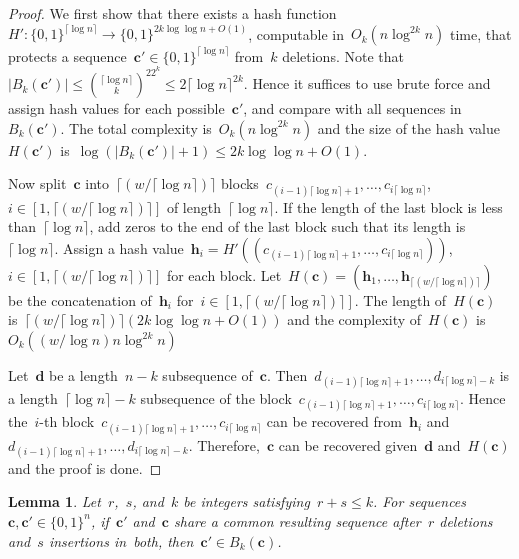 \documentclass[10pt,a4paper,onecolumn]{IEEEtran}
\newtheorem{lemma}{Lemma}
\newcommand{\1}{\mathbbold{1}}
\newcommand{\boldc}{\mathbf{c}}
\newcommand{\boldd}{\mathbf{d}}
\newcommand{\boldh}{\mathbf{h}}
\begin{document}
\begin{proof}
We first show that there exists a hash function~$H': \{0,1\}^{\lceil \log n \rceil}\rightarrow\{0,1\}^{2k\log\log n +O(1)}$, computable in~$O_k(n \log^{2k}n)$ time, that protects a sequence~$\boldc'\in \{0,1\}^{\lceil \log n\rceil}$ from~$k$ deletions. Note that~$|B_k(\boldc')|\le \binom{\lceil \log n\rceil}{k}^22^k\le 2\lceil\log n\rceil^{2k}$. Hence it suffices to use brute force and assign hash values for each possible~$\boldc'$, and compare with all sequences in~$B_k(\boldc')$. The total complexity is~$O_k(n\log^{2k}n)$ and the size of the hash value~$H(\boldc')$ is~$\log (|B_k(\boldc')|+1)\le 2k\log\log n+O(1)$. 

Now split~$\boldc$ into~$\lceil(w/\lceil \log n\rceil)\rceil$ blocks~$c_{(i-1)\lceil \log n \rceil+1},\ldots,c_{i\lceil \log n \rceil}$,~$i\in [1,\lceil(w/\lceil \log n\rceil)\rceil]$ of length~$\lceil \log n \rceil$. If the length of the last block is less than~$\lceil \log n \rceil$, add zeros to the end of the last block such that its length is~$\lceil \log n \rceil$.
Assign a hash value~$\boldh_i=H'((c_{(i-1)\lceil \log n \rceil+1},\ldots,c_{i\lceil \log n \rceil}))$,~$i\in [1,\lceil(w/\lceil \log n\rceil)\rceil]$ for each block. Let~$H(\boldc)=(\boldh_1,\ldots,\boldh_{\lceil(w/\lceil \log n\rceil)\rceil})$ be the concatenation of~$\boldh_i$ for~$i\in [1,\lceil(w/\lceil \log n\rceil)\rceil]$. The length of~$H(\boldc)$ is~$\lceil (w/\lceil \log n \rceil) \rceil (2k\log \log n +O(1))$ and the complexity of~$H(\boldc)$ is~$O_k((w/ \log n)  n\log^{2k} n )$

Let~$\boldd$ be a length~$n-k$ subsequence of~$\boldc$. Then~$d_{(i-1)\lceil \log n \rceil+1},\ldots,d_{i\lceil \log n \rceil-k}$ is a length~$\lceil \log n \rceil-k$ subsequence of the block~$c_{(i-1)\lceil \log n \rceil+1},\ldots,c_{i\lceil \log n \rceil}$. Hence the~$i$-th block~$c_{(i-1)\lceil \log n \rceil+1},\ldots,c_{i\lceil \log n \rceil}$ can be recovered from~$\boldh_i$ and \newline $d_{(i-1)\lceil \log n \rceil+1},\ldots,d_{i\lceil \log n \rceil-k}$. Therefore,~$\boldc$ can be recovered given~$\boldd$ and~$H(\boldc)$ and the proof is done.
\end{proof}
\begin{lemma}\label{lemma:bkball}
Let~$r$,~$s$, and~$k$ be integers satisfying~$r+s\le k$. For sequences~$\boldc,\boldc'\in\{0,1\}^n$, if~$\boldc'$ and~$\boldc$ share a common resulting sequence after~$r$ deletions and~$s$ insertions in~both, then~$\boldc'\in B_k(\boldc)$.
\end{lemma}
\end{document}
